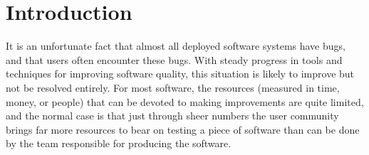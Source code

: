 \section{Introduction}

It is an unfortunate fact that almost all deployed software systems
have bugs, and that users often encounter these bugs.  With steady
progress in tools and techniques for improving software quality, this
situation is likely to improve but not be resolved entirely.  For most
software, the resources (measured in time, money, or people) that can
be devoted to making improvements are quite limited, and the normal case is
that just through sheer numbers the user community 
brings far more resources to bear on testing a piece of software than
can be done by the team responsible for producing the software.

